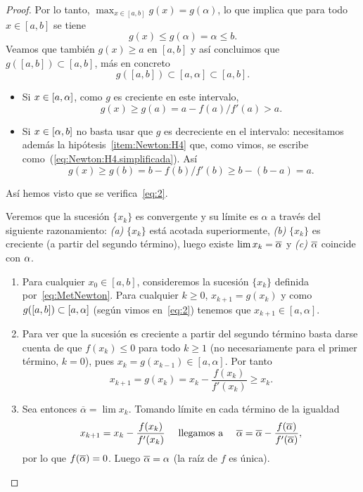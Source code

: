 \begin{proof}
  Por lo tanto, $\max_{x\in [a,b]} g(x)=g(\alpha)$, lo que implica que
  para todo
  $x\in [a,b]$ se tiene
  $$
  g(x)\le g(\alpha)=\alpha \le b.
  $$
  Veamos que también $g(x)\ge a$ en $[a,b]$ y así concluimos que
  $g([a,b]) \subset [a,b]$, más en concreto
  \begin{equation}
    g([a,b])\subset [a,\alpha] \subset [a,b].\label{eq:2}
  \end{equation}

  \begin{itemize}
  \item Si $x\in [a,\alpha]$, como $g$ es creciente en este intervalo,
    $$g(x)\ge  g(a) = a-f(a)/f'(a) > a.$$
  \item Si $x\in [\alpha,b]$ no basta usar que $g$ es
    decreciente en el intervalo: necesitamos además la
    hipótesis~\ref{item:Newton:H4} que, como vimos, se escribe
    como~(\ref{eq:Newton:H4.simplificada}). Así
    $$g(x) \ge g(b)=b-f(b)/f'(b) \ge b-(b-a)=a.$$
  \end{itemize}
  Así hemos visto que se verifica~\eqref{eq:2}.

  Veremos que la sucesión $\{x_k\}$ es convergente y su límite es
  $\alpha$ a través del siguiente razonamiento: \textit{(a)} $\{x_k\}$
  está acotada superiormente, \textit{(b)} $\{x_k\}$ es creciente (a
  partir del segundo término), luego existe $\lim x_k=\overline{\alpha}$
  y \textit{(c)} $\overline{\alpha}$ coincide con $\alpha$.
  \begin{enumerate}[label=\emph{(\alph*)}]
  \item Para cualquier $x_0\in[a,b]$, consideremos la sucesión
    $\{x_k\}$ definida por~\eqref{eq:MetNewton}. Para cualquier $k\ge
    0$, $x_{k+1}=g(x_{k})$ y como $g([a,b])\subset [a,\alpha]$
    (según vimos en~\eqref{eq:2}) tenemos que
    $x_{k+1}\in [a,\alpha]$.
  \item Para ver que la sucesión es creciente a partir del segundo
    término basta darse cuenta de que $f(x_k)\le 0$ para todo $k\ge 1$
    (no necesariamente para el primer término, $k=0$), pues $x_k=g(x_{k-1})\in
    [a,\alpha]$. Por tanto
    $$
    x_{k+1}=g(x_k)=x_k - \frac{f(x_k)}{f'(x_k)} \ge x_k.
    $$
  \item Sea entonces $\overline\alpha = \lim x_k$. Tomando límite en cada
    término de la igualdad
    \begin{equation*}
      x_{k+1}=x_k- \frac{f(x_k)}{f'(x_k)}
      \quad\text{ llegamos a }\quad
      \overline{\alpha} = \overline{\alpha} -
      \frac{f(\overline{\alpha})}{f'(\overline{\alpha})},
    \end{equation*}
    por lo que $f(\overline{\alpha})=0$. Luego $\overline{\alpha}=\alpha$ (la
    raíz de $f$ es única).
  \end{enumerate}


\end{proof}
